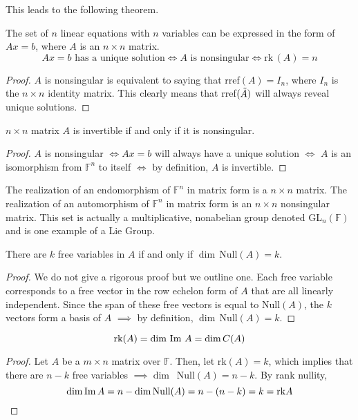   This leads to the following theorem. 

  \begin{theorem}
    The set of $n$ linear equations with $n$ variables can be expressed in the form of $A x = b$, where $A$ is an $n \times n$ matrix. 
    \begin{equation}
      A x = b \text{ has a unique solution} \iff A \text{ is nonsingular} \iff \text{rk}\,(A) = n
    \end{equation}
  \end{theorem}
  \begin{proof}
    $A$ is nonsingular is equivalent to saying that rref$(A) = I_n$, where $I_n$ is the $n \times n$ identity matrix. This clearly means that rref$(\Tilde{A})$ will always reveal unique solutions. 
  \end{proof}

  \begin{theorem}
    $n \times n$ matrix $A$ is invertible if and only if it is nonsingular. 
  \end{theorem}
  \begin{proof}
    $A$ is nonsingular $\iff A x = b$ will always have a unique solution $\iff$ $A$ is an isomorphism from $\mathbb{F}^n$ to itself $\iff$ by definition, $A$ is invertible. 
  \end{proof}

  The realization of an endomorphism of $\mathbb{F}^n$ in matrix form is a $n \times n$ matrix. The realization of an automorphism of $\mathbb{F}^n$ in matrix form is an $n \times n$ nonsingular matrix. This set is actually a multiplicative, nonabelian group denoted GL$_n(\mathbb{F})$ and is one example of a Lie Group. 

  \begin{theorem}
    There are $k$ free variables in $A$ if and only if $\dim\,$Null$(A) = k$. 
  \end{theorem}
  \begin{proof}
    We do not give a rigorous proof but we outline one. Each free variable corresponds to a free vector in the row echelon form of $A$ that are all linearly independent. Since the span of these free vectors is equal to Null$(A)$, the $k$ vectors form a basis of $A$ $\implies$ by definition, $\dim\,$Null$(A) = k$.
  \end{proof}

  \begin{theorem}
    \begin{equation}
      \text{rk}(A) = \dim \, \im \,A = \dim C(A)
    \end{equation}
  \end{theorem}
  \begin{proof}
    Let $A$ be a $m \times n$ matrix over $\mathbb{F}$. Then, let rk$(A) = k$, which implies that there are $n-k$ free variables $\implies \dim \,$ Null$(A) = n - k$. By rank nullity, 
    \begin{equation}
      \dim \im{A} = n - \dim \text{Null}(A) = n - (n -k) = k = \text{rk} A 
    \end{equation}
  \end{proof}

